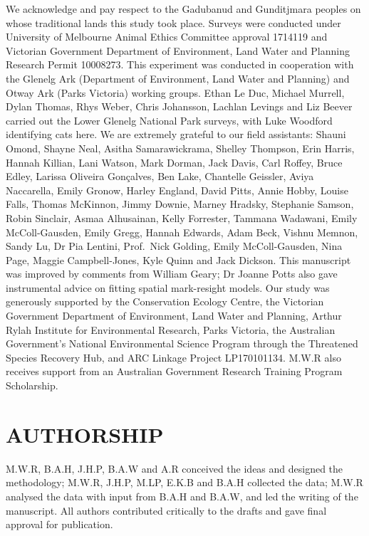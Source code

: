 \documentclass[]{elsarticle} %
\begin{document}
We acknowledge and pay respect to the Gadubanud and Gunditjmara peoples on whose traditional lands this study took place. Surveys were conducted under University of Melbourne Animal Ethics Committee approval 1714119 and Victorian Government Department of Environment, Land Water and Planning Research Permit 10008273. This experiment was conducted in cooperation with the Glenelg Ark (Department of Environment, Land Water and Planning) and Otway Ark (Parks Victoria) working groups. Ethan Le Duc, Michael Murrell, Dylan Thomas, Rhys Weber, Chris Johansson, Lachlan Levings and Liz Beever carried out the Lower Glenelg National Park surveys, with Luke Woodford identifying cats here. We are extremely grateful to our field assistants: Shauni Omond, Shayne Neal, Asitha Samarawickrama, Shelley Thompson, Erin Harris, Hannah Killian, Lani Watson, Mark Dorman, Jack Davis, Carl Roffey, Bruce Edley, Larissa Oliveira Gonçalves, Ben Lake, Chantelle Geissler, Aviya Naccarella, Emily Gronow, Harley England, David Pitts, Annie Hobby, Louise Falls, Thomas McKinnon, Jimmy Downie, Marney Hradsky, Stephanie Samson, Robin Sinclair, Asmaa Alhusainan, Kelly Forrester, Tammana Wadawani, Emily McColl-Gausden, Emily Gregg, Hannah Edwards, Adam Beck, Vishnu Memnon, Sandy Lu, Dr Pia Lentini, Prof.~Nick Golding, Emily McColl-Gausden, Nina Page, Maggie Campbell-Jones, Kyle Quinn and Jack Dickson. This manuscript was improved by comments from William Geary; Dr Joanne Potts also gave instrumental advice on fitting spatial mark-resight models. Our study was generously supported by the Conservation Ecology Centre, the Victorian Government Department of Environment, Land Water and Planning, Arthur Rylah Institute for Environmental Research, Parks Victoria, the Australian Government's National Environmental Science Program through the Threatened Species Recovery Hub, and ARC Linkage Project LP170101134. M.W.R also receives support from an Australian Government Research Training Program Scholarship.

\hypertarget{authorship}{%
\section{AUTHORSHIP}\label{authorship}}

M.W.R, B.A.H, J.H.P, B.A.W and A.R conceived the ideas and designed the methodology; M.W.R, J.H.P, M.LP, E.K.B and B.A.H collected the data; M.W.R analysed the data with input from B.A.H and B.A.W, and led the writing of the manuscript. All authors contributed critically to the drafts and gave final approval for publication.
\end{document}
